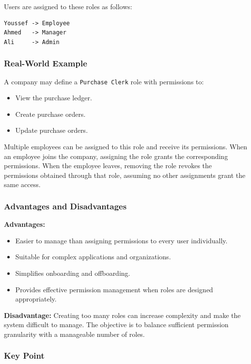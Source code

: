 \documentclass[11pt,a4paper]{article}
\begin{document}
Users are assigned to these roles as follows:
\begin{lstlisting}
Youssef -> Employee
Ahmed   -> Manager
Ali     -> Admin
\end{lstlisting}

\subsubsection{Real-World Example}

A company may define a \texttt{Purchase Clerk} role with permissions to:
\begin{itemize}
    \item View the purchase ledger.
    \item Create purchase orders.
    \item Update purchase orders.
\end{itemize}

Multiple employees can be assigned to this role and receive its permissions.
When an employee joins the company, assigning the role grants the corresponding permissions. When the employee leaves, removing the role revokes the permissions obtained through that role, assuming no other assignments grant the same access.

\subsubsection{Advantages and Disadvantages}

\textbf{Advantages:}
\begin{itemize}
    \item Easier to manage than assigning permissions to every user individually.
    \item Suitable for complex applications and organizations.
    \item Simplifies onboarding and offboarding.
    \item Provides effective permission management when roles are designed appropriately.
\end{itemize}

\textbf{Disadvantage:} Creating too many roles can increase complexity and make the system difficult to manage.
The objective is to balance sufficient permission granularity with a manageable number of roles.

\subsubsection{Key Point}
\end{document}
